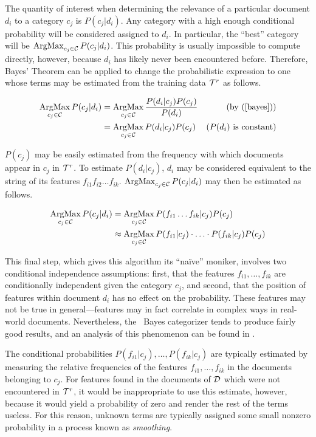 The quantity of interest when determining the relevance of a
particular document $d_i$ to a category $c_j$ is $P(c_j|d_i)$.  Any
category with a high enough conditional probability will be considered
assigned to $d_i$.  In particular, the ``best'' category will be
$\operatorname*{ArgMax}_{c_j\in\mathcal{C}} P(c_j|d_i)$. This probability is usually impossible to
compute directly, however, because $d_i$ has likely never been
encountered before.  Therefore, Bayes' Theorem can be applied to
change the probabilistic expression to one whose terms may be
estimated from the training data $\mathcal{T}^r$ as follows.

\begin{align*}
\operatorname*{ArgMax}_{c_j\in\mathcal{C}} P(c_j|d_i) 
 & = \operatorname*{ArgMax}_{c_j\in\mathcal{C}} \frac{P(d_i|c_j) P(c_j)}{P(d_i)} & (\text{by (\ref{bayes})}) \\
 & = \operatorname*{ArgMax}_{c_j\in\mathcal{C}} P(d_i|c_j) P(c_j) & (P(d_i) \text{ is constant}) \\
\end{align*}

$P(c_j)$ may be easily estimated from the frequency with which
documents appear in $c_j$ in $\mathcal{T}^r$.  To estimate $P(d_i|c_j)$,
$d_i$ may be considered equivalent to the string of its features
$f_{i1} f_{i2} \ldots f_{ik}$.  $\operatorname*{ArgMax}_{c_j\in\mathcal{C}} P(c_j|d_i)$ may
then be estimated as follows.

\begin{align*}
\operatorname*{ArgMax}_{c_j\in\mathcal{C}} P(c_j|d_i) 
 & = \operatorname*{ArgMax}_{c_j\in\mathcal{C}} P(f_{i1} \ldots f_{ik}|c_j) P(c_j) \\
 & \approx \operatorname*{ArgMax}_{c_j\in\mathcal{C}} P(f_{i1}|c_j) \cdot \ldots \cdot P(f_{ik}|c_j) P(c_j) \\
\end{align*}

This final step, which gives this algorithm its ``na\"ive'' moniker,
involves two conditional independence assumptions: first, that the
features $f_{i1}, \ldots, f_{ik}$ are conditionally independent given
the category $c_j$, and second, that the position of features within
document $d_i$ has no effect on the probability.  These features may
not be true in general---features may in fact correlate in complex
ways in real-world documents.  Nevertheless, the \naive\ Bayes
categorizer tends to produce fairly good results, and an analysis of
this phenomenon can be found in \cite{domingos:97}.

The conditional probabilities $P(f_{i1}|c_j), \ldots, P(f_{ik}|c_j)$
are typically estimated by measuring the relative frequencies of the
features $f_{i1}, \ldots, f_{ik}$ in the documents belonging to
$c_j$.  For features found in the documents of $\mathcal{D}$ which were not
encountered in $\mathcal{T}^r$, it would be inappropriate to use this
estimate, however, because it would yield a probability of zero and
render the rest of the terms useless.  For this reason, unknown terms
are typically assigned some small nonzero probability in a process
known as \emph{smoothing}.

